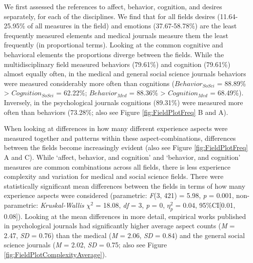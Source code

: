 We first assessed the references to affect, behavior, cognition, and
desires separately, for each of the disciplines. We find that for all
fields desires (11.64-25.95\% of all measures in the field) and emotions
(37.67-58.78\%) are the least frequently measured elements and medical
journals measure them the least frequently (in proportional terms).
Looking at the common cognitive and behavioral elements the proportions
diverge between the fields. While the multidisciplinary field measured
behaviors (79.61\%) and cognition (79.61\%) almost equally often, in the
medical and general social science journals behaviors were measured
considerably more often than cognitions (\(Behavior_{SoSci}\) = 88.89\%
\textgreater{} \(Cognition_{SoSci}\) = 62.22\%; \(Behavior_{Med}\) =
88.36\% \textgreater{} \(Cognition_{Med}\) = 68.49\%). Inversely, in the
psychological journals cognitions (89.31\%) were measured more often
than behaviors (73.28\%; also see Figure \ref{fig:FieldPlotFreq} B and
A).

When looking at differences in how many different experience aspects
were measured together and patterns within these aspect-combinations,
differences between the fields become increasingly evident (also see
Figure \ref{fig:FieldPlotFreq} A and C). While `affect, behavior, and
cognition' and `behavior, and cognition' measures are common
combinations across all fields, there is less experience complexity and
variation for medical and social science fields. There were
statistically significant mean differences between the fields in terms
of how many experience aspects were considered (parametric:
\textit{F}(3, 421) = 5.98, \textit{p} = 0.001, non-parametric:
\textit{Kruskal-Wallis} \(\chi^{2}\) = 18.08, \textit{df} = 3,
\textit{p} = 0, \(\eta_{p}^{2}\) = 0.04, 95\%CI{[}0.01, 0.08{]}).
Looking at the mean differences in more detail, empirical works
published in psychological journals had significantly higher average
aspect counts (\textit{M} = 2.47, \textit{SD} = 0.76) than the medical
(\textit{M} = 2.06, \textit{SD} = 0.84) and the general social science
journals (\textit{M} = 2.02, \textit{SD} = 0.75; also see Figure
\ref{fig:FieldPlotComplexityAverage}).


